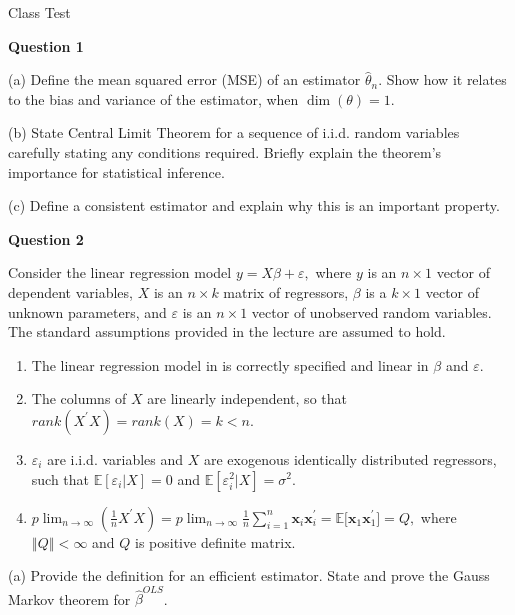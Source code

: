 \documentclass{article}
\begin{document}
\begin{center}
{\Large Class Test}
\end{center}

\textbf{Question 1}

(a) Define the mean squared error (MSE) of an estimator $\hat{\theta}_{n}$.
Show how it relates to the bias and variance of the estimator, when $\dim
\left( \theta \right) =1$.

(b) State Central Limit Theorem for a sequence of i.i.d. random variables
carefully stating any conditions required. Briefly explain the theorem's
importance for statistical inference.

(c) Define a consistent estimator and explain why this is an important
property.

\bigskip

\textbf{Question 2}

Consider the linear regression model $y=X\beta +\varepsilon ,$ where $y$ is
an $n\times 1$ vector of dependent variables, $X$ is an $n\times k$ matrix
of regressors, $\beta $ is a $k\times 1$ vector of unknown parameters, and $%
\varepsilon $ is an $n\times 1$ vector of unobserved random variables. The
standard assumptions provided in the lecture are assumed to hold.

\begin{enumerate}
\item The linear regression model in is correctly specified and linear in $%
\beta $ and $\varepsilon .$

\item The columns of $X$ are linearly independent, so that $rank(X^{\prime
}X)=rank(X)=k<n.$

\item $\varepsilon _{i}$ are i.i.d. variables and $X$ are exogenous
identically distributed regressors, such that $\mathbb{E}[\varepsilon
_{i}|X]=0$ and $\mathbb{E}[\varepsilon _{i}^{2}|X]=\sigma ^{2}.$

\item $p\lim_{n\rightarrow \infty }(\frac{1}{n}X^{\prime
}X)=p\lim_{n\rightarrow \infty }\frac{1}{n}\sum_{i=1}^{n}\mathbf{x}_{i}%
\mathbf{x}_{i}^{\prime }=\mathbb{E[}\mathbf{x}_{1}\mathbf{x}_{1}^{\prime
}]=Q,$ where $\left\Vert Q\right\Vert <\infty $ and $Q$ is positive definite
matrix.
\end{enumerate}

(a) Provide the definition for an efficient estimator. State and prove the
Gauss Markov theorem for $\hat{\beta}^{OLS}$.
\end{document}
